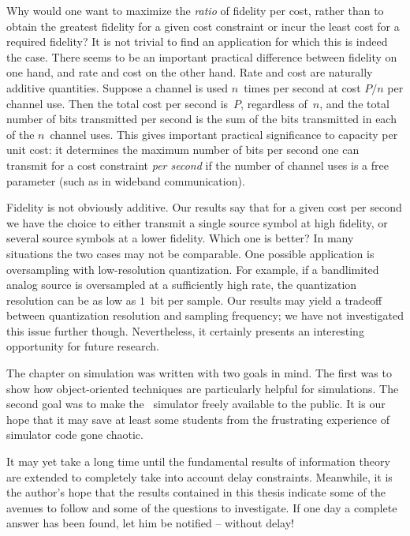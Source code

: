 Why would one want to maximize the \emph{ratio} of fidelity per cost, rather
than to obtain the greatest fidelity for a given cost constraint or incur the
least cost for a required fidelity? It is not trivial to find an application for
which this is indeed the case. There seems to be an important practical
difference between fidelity on one hand, and rate and cost on the other hand.
Rate and cost are naturally additive quantities. Suppose a channel is used
$n$~times per second at cost $P/n$ per channel use. Then the total cost per
second is~$P$, regardless of~$n$, and the total number of bits transmitted per
second is the sum of the bits transmitted in each of the $n$~channel uses. This
gives important practical significance to capacity per unit cost: it determines
the maximum number of bits per second one can transmit for a cost constraint
\emph{per second} if the number of channel uses is a free parameter (such as in
wideband communication). 

Fidelity is not obviously additive. Our results say that for a given cost per
second we have the choice to either transmit a single source symbol at high
fidelity, or several source symbols at a lower fidelity.  Which one is
better? In many situations the two cases may not be comparable. One possible
application is oversampling with low-resolution quantization.  For example, if a
bandlimited analog source is oversampled at a sufficiently high rate, the
quantization resolution can be as low as $1$~bit per sample. Our
results may yield a tradeoff between quantization resolution and sampling
frequency; we have not investigated this issue further though.  Nevertheless, it
certainly presents an interesting opportunity for future research. 

\medbreak

The chapter on simulation was written with two goals in mind. The first was to
show how object-oriented techniques are particularly helpful for simulations.
The second goal was to make the \jscsim\ simulator freely available to the
public. It is our hope that it may save at least some students from the
frustrating experience of simulator code gone chaotic. 

\medbreak

It may yet take a long time until the fundamental results of information theory
are extended to completely take into account delay constraints. Meanwhile, it is
the author's hope that the results contained in this thesis indicate some of the
avenues to follow and some of the questions to investigate. If one day a
complete answer has been found, let him be notified -- without delay!
